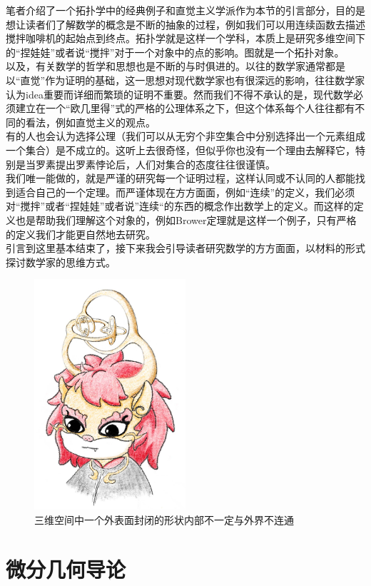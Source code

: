 \documentclass[a4paper,10pt]{article}
\begin{document}
笔者介绍了一个拓扑学中的经典例子和直觉主义学派作为本节的引言部分，目的是想让读者们了解数学的概念是不断的抽象的过程，例如我们可以用连续函数去描述搅拌咖啡机的起始点到终点。拓扑学就是这样一个学科，本质上是研究多维空间下的“捏娃娃”或者说“搅拌”对于一个对象中的点的影响。图就是一个拓扑对象。\\以及，有关数学的哲学和思想也是不断的与时俱进的。以往的数学家通常都是以“直觉”作为证明的基础，这一思想对现代数学家也有很深远的影响，往往数学家认为idea重要而详细而繁琐的证明不重要。然而我们不得不承认的是，现代数学必须建立在一个“欧几里得”式的严格的公理体系之下，但这个体系每个人往往都有不同的看法，例如直觉主义的观点。\\
有的人也会认为选择公理（我们可以从无穷个非空集合中分别选择出一个元素组成一个集合）是不成立的。这听上去很奇怪，但似乎你也没有一个理由去解释它，特别是当罗素提出罗素悖论后，人们对集合的态度往往很谨慎。\\
我们唯一能做的，就是严谨的研究每一个证明过程，这样认同或不认同的人都能找到适合自己的一个定理。而严谨体现在方方面面，例如“连续”的定义，我们必须对“搅拌”或者“捏娃娃”或者说”连续“的东西的概念作出数学上的定义。而这样的定义也是帮助我们理解这个对象的，例如Brower定理就是这样一个例子，只有严格的定义我们才能更自然地去研究。\\
引言到这里基本结束了，接下来我会引导读者研究数学的方方面面，以材料的形式探讨数学家的思维方式。
\begin{figure}[htb]
    \centering
    \includegraphics[width=0.5\textwidth]{麒麟.jpg}
    \caption{三维空间中一个外表面封闭的形状内部不一定与外界不连通}
    \label{麒麟图}
\end{figure}
\newpage
\section{微分几何导论}
\end{document}
